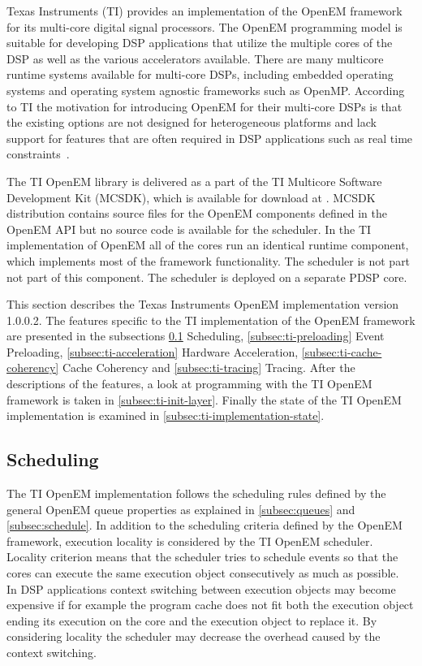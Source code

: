 Texas Instruments (TI) provides an implementation of the OpenEM framework for its multi-core digital signal processors. The OpenEM programming model is suitable for developing DSP applications that utilize the multiple cores of the DSP as well as the various accelerators available. There are many multicore runtime systems available for multi-core DSPs, including embedded operating systems and operating system agnostic frameworks such as OpenMP. According to TI the motivation for introducing OpenEM for their multi-core DSPs is that the existing options are not designed for heterogeneous platforms and lack support for features that are often required in DSP applications such as real time constraints~\cite{moerman2014open}.

The TI OpenEM library is delivered as a part of the TI Multicore Software Development Kit (MCSDK), which is available for download at \cite{mcsdkdown}. MCSDK distribution contains source files for the OpenEM components defined in the OpenEM API but no source code is available for the scheduler. In the TI implementation of OpenEM all of the cores run an identical runtime component, which implements most of the framework functionality. The scheduler is not part not part of this component. The scheduler is deployed on a separate PDSP core.

This section describes the Texas Instruments OpenEM implementation version 1.0.0.2. The features specific to the TI implementation of the OpenEM framework are presented in the subsections \ref{subsec:ti-scheduling} Scheduling, \ref{subsec:ti-preloading} Event Preloading, \ref{subsec:ti-acceleration} Hardware Acceleration, \ref{subsec:ti-cache-coherency} Cache Coherency and \ref{subsec:ti-tracing} Tracing. After the descriptions of the features, a look at programming with the TI OpenEM framework is taken in \ref{subsec:ti-init-layer}. Finally the state of the TI OpenEM implementation is examined in \ref{subsec:ti-implementation-state}.

\subsection{Scheduling}
\label{subsec:ti-scheduling}
The TI OpenEM implementation follows the scheduling rules defined by the general OpenEM queue properties as explained in \ref{subsec:queues} and \ref{subsec:schedule}. In addition to the scheduling criteria defined by the OpenEM framework, execution locality is considered by the TI OpenEM scheduler. Locality criterion means that the scheduler tries to schedule events so that the cores can execute the same execution object consecutively as much as possible.~\cite{moerman2014open} In DSP applications context switching between execution objects may become expensive if for example the program cache does not fit both the execution object ending its execution on the core and the execution object to replace it. By considering locality the scheduler may decrease the overhead caused by the context switching.

